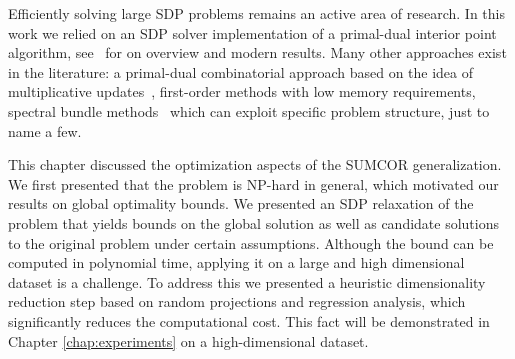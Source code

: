 Efficiently solving large SDP problems remains an active area
of research. In this work we relied on an SDP solver implementation of a primal-dual interior point
algorithm, see~\cite{todd2008study}\cite{wang2009new} for on overview and modern results. Many other
approaches exist in the literature: a primal-dual combinatorial approach based on the idea of multiplicative
updates~\cite{arora2007combinatorial}, first-order methods with low memory requirements\cite{lu2007large}, spectral bundle
methods~\cite{helmberg2000spectral} which can exploit specific problem structure, just to name a few.

\vspace{5mm}
This chapter discussed the optimization aspects of the SUMCOR generalization. We first presented that the problem is NP-hard in general, which
motivated our results on global optimality bounds. We presented an SDP relaxation of the problem that yields bounds on the global solution
as well as candidate solutions to the original problem under certain assumptions. Although the bound can be computed in polynomial time,
applying it on a large and high dimensional dataset is a challenge. To address this we presented a heuristic dimensionality reduction
step based on random projections and regression analysis, which significantly reduces the computational cost. This fact will be demonstrated in Chapter \ref{chap:experiments}
on a high-dimensional dataset.
